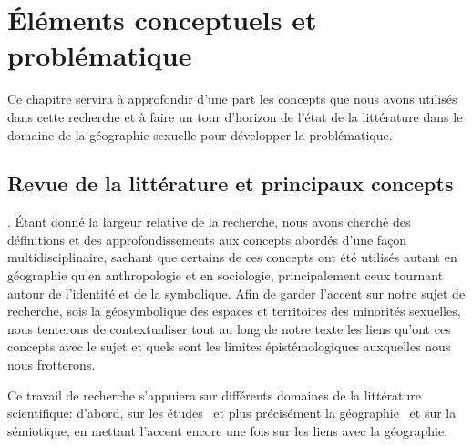 \chapter{Éléments conceptuels et problématique}
\label{cha:elements_conceptuels_et_problematique}


Ce chapitre servira à approfondir d'une part les concepts que nous avons utilisés dans cette recherche et à faire un tour d'horizon de l'état de la littérature dans le domaine de la géographie sexuelle pour développer la problématique.

\section{Revue de la littérature et principaux concepts}
\label{sec:revue_de_la_litterature_et_principaux_concepts} 

.
Étant donné la largeur relative de la recherche, nous avons cherché des définitions et des approfondissements aux concepts abordés d'une façon multidisciplinaire, sachant que certains de ces concepts ont été utilisés autant en géographie qu'en anthropologie et en sociologie, principalement ceux tournant autour de l'identité et de la symbolique. 
Afin de garder l’accent sur notre sujet de recherche, sois la géosymbolique des espaces et territoires des minorités sexuelles, nous tenterons de contextualiser tout au long de notre texte les liens qu'ont ces concepts avec le sujet et quels sont les limites épistémologiques auxquelles nous nous frotterons. 

Ce travail de recherche s’appuiera sur différents domaines de la littérature scientifique: d'abord, sur les études \qus\ et plus précisément la géographie \qu\ et sur la sémiotique, en mettant l'accent encore une fois sur les liens avec la géographie. 

